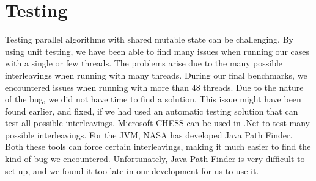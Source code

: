 \section{Testing}
\label{sec:testing}
Testing parallel algorithms with shared mutable state can be challenging. By using unit testing, we have been able to find many issues when running our cases with a single or few threads. The problems arise due to the many possible interleavings when running with many threads. During our final benchmarks, we encountered issues when running with more than 48 threads. Due to the nature of the bug, we did not have time to find a solution. This issue might have been found earlier, and fixed, if we had used an automatic testing solution that can test all possible interleavings. Microsoft CHESS can be used in .Net to test many possible interleavings. For the JVM, NASA has developed Java Path Finder. Both these tools can force certain interleavings, making it much easier to find the kind of bug we encountered. Unfortunately, Java Path Finder is very difficult to set up, and we found it too late in our development for us to use it.
